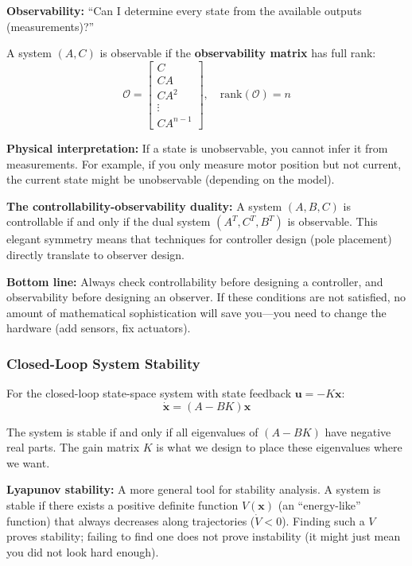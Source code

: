 \textbf{Observability:} ``Can I determine every state from the available outputs (measurements)?''

A system $(A, C)$ is observable if the \textbf{observability matrix} has full rank:
\begin{equation}
\mathcal{O} = \begin{bmatrix} C \\ CA \\ CA^2 \\ \vdots \\ CA^{n-1} \end{bmatrix}, \quad \text{rank}(\mathcal{O}) = n
\end{equation}

\textbf{Physical interpretation:} If a state is unobservable, you cannot infer it from measurements. For example, if you only measure motor position but not current, the current state might be unobservable (depending on the model).

\textbf{The controllability-observability duality:} A system $(A, B, C)$ is controllable if and only if the dual system $(A^T, C^T, B^T)$ is observable. This elegant symmetry means that techniques for controller design (pole placement) directly translate to observer design.

\textbf{Bottom line:} Always check controllability before designing a controller, and observability before designing an observer. If these conditions are not satisfied, no amount of mathematical sophistication will save you---you need to change the hardware (add sensors, fix actuators).

\subsubsection{Closed-Loop System Stability}

For the closed-loop state-space system with state feedback $\mathbf{u} = -K\mathbf{x}$:
\begin{equation}
\dot{\mathbf{x}} = (A - BK)\mathbf{x}
\end{equation}

The system is stable if and only if all eigenvalues of $(A - BK)$ have negative real parts. The gain matrix $K$ is what we design to place these eigenvalues where we want.

\textbf{Lyapunov stability:} A more general tool for stability analysis. A system is stable if there exists a positive definite function $V(\mathbf{x})$ (an ``energy-like'' function) that always decreases along trajectories ($\dot{V} < 0$). Finding such a $V$ proves stability; failing to find one does not prove instability (it might just mean you did not look hard enough).

